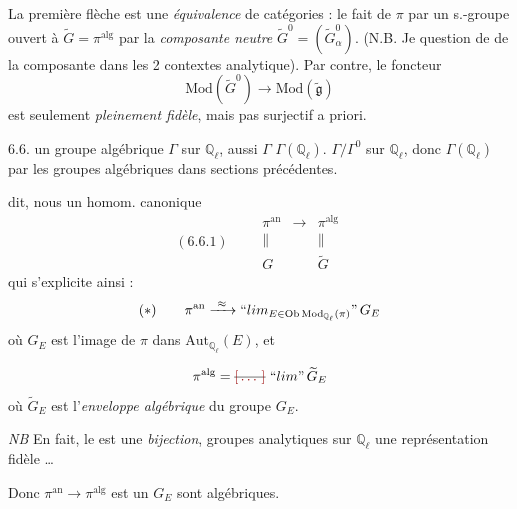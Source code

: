 \documentclass[11pt,a4paper]{article}
\begin{document}
La première flèche est une \emph{équivalence}  de catégories : le fait de  $\pi$ par un
s.-groupe ouvert \ill{}  à 
$\widetilde{G} = \pi^{\mathrm{alg}}$ par la \emph{composante neutre}
$\widetilde{G}^{0} = (\widetilde{G}_\alpha^{0})$. (N.B. Je \ill{} \ill{} question de
 de la composante \ill{} dans les 2 contextes \ill{} analytique).
Par contre, le foncteur
\[
  \mathrm{Mod}(\widetilde{G}^{0}) \longrightarrow \mathrm{Mod}(\widetilde{\mathfrak{g}})
\]
est seulement \emph{pleinement fidèle}, mais \struck{\ill{}} pas
\struck{\ill{}}  surjectif a priori.

6.6.   un groupe algébrique $\Gamma$ sur
$\mathbb{Q}_\ell$, \ill{} aussi $\Gamma$ \ill{}
$\Gamma(\mathbb{Q}_\ell)$. \ill{} \ill{}  \ill{} \ill{}
$\Gamma/\Gamma^{0}$  \ill{} sur $\mathbb{Q}_\ell$, donc
$\Gamma(\mathbb{Q}_\ell)$ \ill{} \ill{} \ill{} \ill{} \ill{} par les groupes
algébriques  dans \ill{} sections précédentes.

 dit, nous  un homom. canonique
\[
  (6.6.1)\qquad
  \begin{array}{ccc}
    \pi^{\mathrm{an}} & \longrightarrow & \pi^{\mathrm{alg}} \\
    \| & & \| \\
    G & & \widetilde{G}
  \end{array}
\]
qui s'explicite ainsi :
\[
  (\ast)\qquad \pi^{\mathrm{an}} \xrightarrow{\ \approx\ } \text{“}\varprojlim_{E \in \mathrm{Ob}\,\mathrm{Mod}_{\mathbb{Q}_\ell}(\pi)}\text{”}\, G_E
\]
où $G_E$ est l'image de $\pi$ dans $\mathrm{Aut}_{\mathbb{Q}_\ell}(E)$, et

\[
  \pi^{\mathrm{alg}} = \text{\struck{\ill{}}}\ \text{“}\varprojlim\text{”}\, \widetilde{G}_E
\]
où $\widetilde{G}_E$ est l'\emph{enveloppe algébrique} du groupe
 $G_E$.

\emph{NB} En fait, le  \ill{} est une \emph{bijection}, \ill{}
 groupes analytiques  sur $\mathbb{Q}_\ell$
\ill{} une représentation  fidèle …

Donc $\pi^{\mathrm{an}} \to \pi^{\mathrm{alg}}$ est un \emph{}
\struck{\ill{}}   \ill{} $G_E$ sont 
\struck{\ill{}} \ill{} algébriques.
\end{document}
